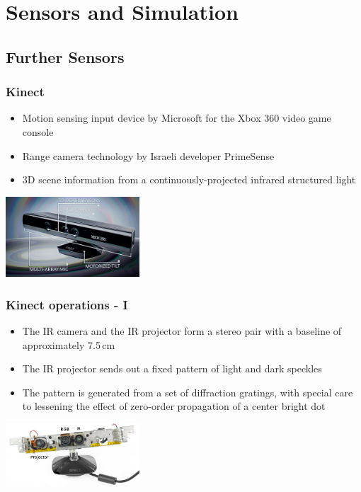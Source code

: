 \section{Sensors and Simulation}
\subsection{Further Sensors}

\begin{frame} 
 \frametitle{Kinect}
\begin{itemize}
 \item Motion sensing input device by Microsoft for the Xbox 360 video game console
 \item Range camera technology by Israeli developer PrimeSense
 \item 3D scene information from a continuously-projected infrared structured light
\end{itemize}
\hspace{35ex}\includegraphics[width=5cm]{img/kinect.png}
\end{frame}

\begin{frame}
 \frametitle{Kinect operations - I}

\begin{itemize}
  \item The IR camera and the IR projector form a stereo pair with a baseline of approximately 7.5\,cm
  \item The IR projector sends out a fixed pattern of light and dark speckles
  \item The pattern is generated from a set of diffraction gratings, with special care to lessening the effect of zero-order propagation of a center bright dot
\end{itemize}
\hspace{35ex}\includegraphics[width=5cm]{img/kinect2.png} 
\end{frame}

